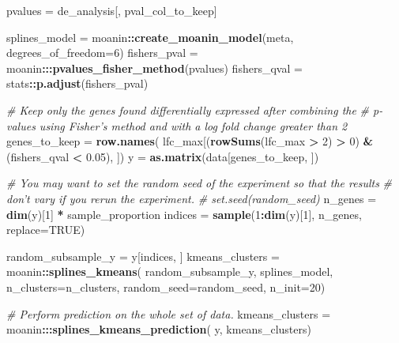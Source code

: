 \documentclass[9pt,a4paper,]{extarticle}
\newenvironment{Shaded}{\begin{snugshade}}{\end{snugshade}}
\newcommand{\CommentTok}[1]{\textcolor[rgb]{0.56,0.35,0.01}{\textit{#1}}}
\newcommand{\DataTypeTok}[1]{\textcolor[rgb]{0.13,0.29,0.53}{#1}}
\newcommand{\DecValTok}[1]{\textcolor[rgb]{0.00,0.00,0.81}{#1}}
\newcommand{\FloatTok}[1]{\textcolor[rgb]{0.00,0.00,0.81}{#1}}
\newcommand{\KeywordTok}[1]{\textcolor[rgb]{0.13,0.29,0.53}{\textbf{#1}}}
\newcommand{\NormalTok}[1]{#1}
\newcommand{\OperatorTok}[1]{\textcolor[rgb]{0.81,0.36,0.00}{\textbf{#1}}}
\newcommand{\OtherTok}[1]{\textcolor[rgb]{0.56,0.35,0.01}{#1}}
\newcommand{\StringTok}[1]{\textcolor[rgb]{0.31,0.60,0.02}{#1}}
\begin{document}
\begin{Shaded}
\begin{Highlighting}[]
\NormalTok{pvalues =}\StringTok{ }\NormalTok{de_analysis[, pval_col_to_keep]}

\NormalTok{splines_model =}\StringTok{ }\NormalTok{moanin}\OperatorTok{::}\KeywordTok{create_moanin_model}\NormalTok{(meta, }\DataTypeTok{degrees_of_freedom=}\DecValTok{6}\NormalTok{)}
\NormalTok{fishers_pval =}\StringTok{ }\NormalTok{moanin}\OperatorTok{:::}\KeywordTok{pvalues_fisher_method}\NormalTok{(pvalues)}
\NormalTok{fishers_qval =}\StringTok{ }\NormalTok{stats}\OperatorTok{::}\KeywordTok{p.adjust}\NormalTok{(fishers_pval)}

\CommentTok{# Keep only the genes found differentially expressed after combining the}
\CommentTok{# p-values using Fisher's method and with a log fold change greater than 2}
\NormalTok{genes_to_keep =}\StringTok{ }\KeywordTok{row.names}\NormalTok{(}
\NormalTok{    lfc_max[(}\KeywordTok{rowSums}\NormalTok{(lfc_max }\OperatorTok{>}\StringTok{ }\DecValTok{2}\NormalTok{) }\OperatorTok{>}\StringTok{ }\DecValTok{0}\NormalTok{) }\OperatorTok{&}\StringTok{ }\NormalTok{(fishers_qval }\OperatorTok{<}\StringTok{ }\FloatTok{0.05}\NormalTok{), ])}
\NormalTok{y =}\StringTok{ }\KeywordTok{as.matrix}\NormalTok{(data[genes_to_keep, ])}

\CommentTok{# You may want to set the random seed of the experiment so that the results}
\CommentTok{# don't vary if you rerun the experiment.}
\CommentTok{# set.seed(random_seed)}
\NormalTok{n_genes =}\StringTok{ }\KeywordTok{dim}\NormalTok{(y)[}\DecValTok{1}\NormalTok{] }\OperatorTok{*}\StringTok{ }\NormalTok{sample_proportion}
\NormalTok{indices =}\StringTok{ }\KeywordTok{sample}\NormalTok{(}\DecValTok{1}\OperatorTok{:}\KeywordTok{dim}\NormalTok{(y)[}\DecValTok{1}\NormalTok{], n_genes, }\DataTypeTok{replace=}\OtherTok{TRUE}\NormalTok{)}

\NormalTok{random_subsample_y =}\StringTok{ }\NormalTok{y[indices, ]}
\NormalTok{kmeans_clusters =}\StringTok{ }\NormalTok{moanin}\OperatorTok{::}\KeywordTok{splines_kmeans}\NormalTok{(}
\NormalTok{    random_subsample_y, splines_model, }\DataTypeTok{n_clusters=}\NormalTok{n_clusters,}
    \DataTypeTok{random_seed=}\NormalTok{random_seed,}
    \DataTypeTok{n_init=}\DecValTok{20}\NormalTok{)}

\CommentTok{# Perform prediction on the whole set of data.}
\NormalTok{kmeans_clusters =}\StringTok{ }\NormalTok{moanin}\OperatorTok{:::}\KeywordTok{splines_kmeans_prediction}\NormalTok{(}
\NormalTok{    y, kmeans_clusters)}
\end{Highlighting}
\end{Shaded}
\end{document}
